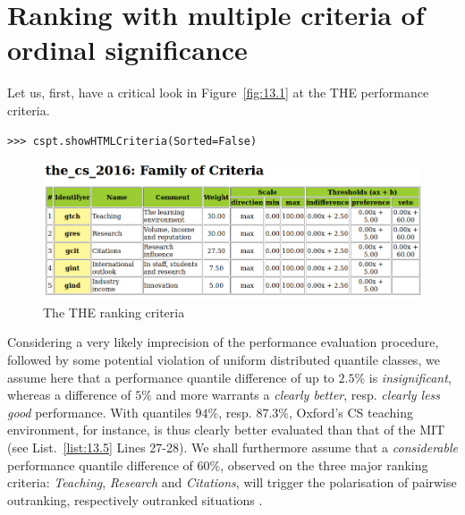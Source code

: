 \section{Ranking with multiple criteria of ordinal significance}
\label{sec:13.2}

Let us, first, have a critical look in Figure~\vref{fig:13.1} at the THE performance criteria.
\begin{lstlisting}
>>> cspt.showHTMLCriteria(Sorted=False)
\end{lstlisting}
\begin{figure}[ht]
\includegraphics[width=\hsize]{Figures/13-1-the_cs_2016Criteria.png}
\caption{The THE ranking criteria}
\label{fig:13.1}       %
\end{figure}

Considering a very likely imprecision of the performance evaluation procedure, followed by some potential violation of uniform distributed quantile classes, we assume here that a performance quantile difference of up to $2.5\%$ is \emph{insignificant}, whereas a difference of $5\%$ and more warrants a \emph{clearly better}, resp. \emph{clearly less good} performance. With quantiles $94\%$, resp. $87.3\%$, Oxford's CS teaching environment, for instance, is thus clearly better evaluated than that of the MIT (see List.~\vref{list:13.5} Lines 27-28). We shall furthermore assume that a \emph{considerable} performance quantile difference of $60\%$, observed on the three major ranking criteria: \emph{Teaching}, \emph{Research} and \emph{Citations}, will trigger the polarisation of pairwise outranking, respectively outranked situations \citep{BIS-2013}.

